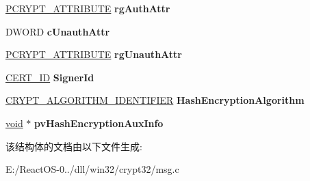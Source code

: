 \begin{DoxyCompactItemize}
\item 
\mbox{\label{struct___c_m_s_g___s_i_g_n_e_r___e_n_c_o_d_e___i_n_f_o___w_i_t_h___c_m_s_a71919125a19272b1b20f10847ec4b179}} 
\hyperlink{struct___c_r_y_p_t___a_t_t_r_i_b_u_t_e}{P\+C\+R\+Y\+P\+T\+\_\+\+A\+T\+T\+R\+I\+B\+U\+TE} {\bfseries rg\+Auth\+Attr}
\item 
\mbox{\label{struct___c_m_s_g___s_i_g_n_e_r___e_n_c_o_d_e___i_n_f_o___w_i_t_h___c_m_s_acc32ef0883ad43725b970dc22085b94f}} 
D\+W\+O\+RD {\bfseries c\+Unauth\+Attr}
\item 
\mbox{\label{struct___c_m_s_g___s_i_g_n_e_r___e_n_c_o_d_e___i_n_f_o___w_i_t_h___c_m_s_ab86732bcd9212f80c963330db75d7b0c}} 
\hyperlink{struct___c_r_y_p_t___a_t_t_r_i_b_u_t_e}{P\+C\+R\+Y\+P\+T\+\_\+\+A\+T\+T\+R\+I\+B\+U\+TE} {\bfseries rg\+Unauth\+Attr}
\item 
\mbox{\label{struct___c_m_s_g___s_i_g_n_e_r___e_n_c_o_d_e___i_n_f_o___w_i_t_h___c_m_s_a573307f85eeb64c8fb3783d21922b144}} 
\hyperlink{struct___c_e_r_t___i_d}{C\+E\+R\+T\+\_\+\+ID} {\bfseries Signer\+Id}
\item 
\mbox{\label{struct___c_m_s_g___s_i_g_n_e_r___e_n_c_o_d_e___i_n_f_o___w_i_t_h___c_m_s_accd1b5be2bf2aa5d7fe7c728101db88e}} 
\hyperlink{struct___c_r_y_p_t___a_l_g_o_r_i_t_h_m___i_d_e_n_t_i_f_i_e_r}{C\+R\+Y\+P\+T\+\_\+\+A\+L\+G\+O\+R\+I\+T\+H\+M\+\_\+\+I\+D\+E\+N\+T\+I\+F\+I\+ER} {\bfseries Hash\+Encryption\+Algorithm}
\item 
\mbox{\label{struct___c_m_s_g___s_i_g_n_e_r___e_n_c_o_d_e___i_n_f_o___w_i_t_h___c_m_s_a76cdbd8a3facf61043ac9ecb78888f4f}} 
\hyperlink{interfacevoid}{void} $\ast$ {\bfseries pv\+Hash\+Encryption\+Aux\+Info}
\end{DoxyCompactItemize}


该结构体的文档由以下文件生成\+:\begin{DoxyCompactItemize}
\item 
E\+:/\+React\+O\+S-\/0../dll/win32/crypt32/msg.\+c\end{DoxyCompactItemize}
